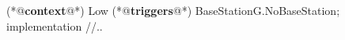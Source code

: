 \begin{Sbox}
\begin{minipage}{\columnwidth}
\begin{csource}
(*@\textbf{context}@*) Low {
 (*@\textbf{triggers}@*) BaseStationG.NoBaseStation;
}implementation {
 //..}
\end{csource}
\end{minipage}
\end{Sbox}